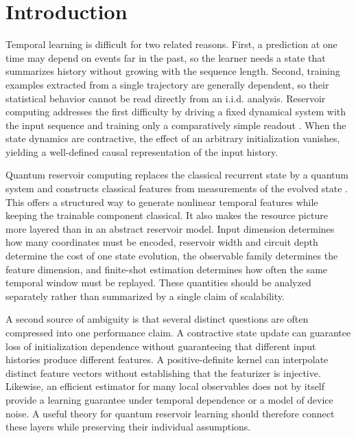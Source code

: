 \section{Introduction}
\label{sec:introduction}

Temporal learning is difficult for two related reasons. First, a prediction at
one time may depend on events far in the past, so the learner needs a state that
summarizes history without growing with the sequence length. Second, training
examples extracted from a single trajectory are generally dependent, so their
statistical behavior cannot be read directly from an i.i.d. analysis. Reservoir
computing addresses the first difficulty by driving a fixed dynamical system
with the input sequence and training only a comparatively simple readout
\citep{Jaeger2001,MaassNatschlagerMarkram2002}. When the state dynamics are
contractive, the effect of an arbitrary initialization vanishes, yielding a
well-defined causal representation of the input history.

Quantum reservoir computing replaces the classical recurrent state by a
quantum system and constructs classical features from measurements of the
evolved state \citep{FujiiNakajima2017,ChenNurdinYamamoto2020}. This offers a
structured way to generate nonlinear temporal features while keeping the
trainable component classical. It also makes the resource picture more
layered than in an abstract reservoir model. Input dimension determines how
many coordinates must be encoded, reservoir width and circuit depth determine
the cost of one state evolution, the observable family determines the feature
dimension, and finite-shot estimation determines how often the same temporal
window must be replayed. These quantities should be analyzed separately rather
than summarized by a single claim of scalability.

A second source of ambiguity is that several distinct questions are often
compressed into one performance claim. A contractive state update can guarantee
loss of initialization dependence without guaranteeing that different input
histories produce different features. A positive-definite kernel can
interpolate distinct feature vectors without establishing that the featurizer
is injective. Likewise, an efficient estimator for many local observables does
not by itself provide a learning guarantee under temporal dependence or a
model of device noise. A useful theory for quantum reservoir learning should
therefore connect these layers while preserving their individual assumptions.

